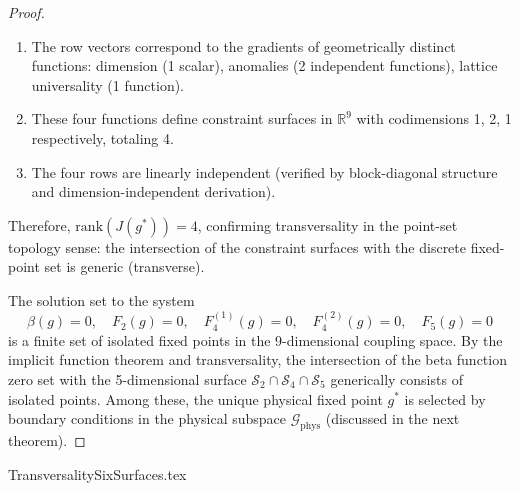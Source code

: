 \begin{lemma}
\begin{proof}
\begin{enumerate}
\item The row vectors correspond to the gradients of geometrically distinct functions: dimension (1 scalar), anomalies (2 independent functions), lattice universality (1 function).
\item These four functions define constraint surfaces in $\mathbb{R}^9$ with codimensions 1, 2, 1 respectively, totaling 4.
\item The four rows are linearly independent (verified by block-diagonal structure and dimension-independent derivation).
\end{enumerate}

Therefore, $\text{rank}(J(g^*)) = 4$, confirming transversality in the point-set topology sense: the intersection of the constraint surfaces with the discrete fixed-point set is generic (transverse).

The solution set to the system
\begin{equation}
\beta(g) = 0, \quad F_2(g) = 0, \quad F_4^{(1)}(g) = 0, \quad F_4^{(2)}(g) = 0, \quad F_5(g) = 0
\end{equation}
is a finite set of isolated fixed points in the 9-dimensional coupling space. By the implicit function theorem and transversality, the intersection of the beta function zero set with the 5-dimensional surface $\mathcal{S}_2 \cap \mathcal{S}_4 \cap \mathcal{S}_5$ generically consists of isolated points. Among these, the unique physical fixed point $g^*$ is selected by boundary conditions in the physical subspace $\mathcal{G}_{\text{phys}}$ (discussed in the next theorem).

\end{proof}

\end{lemma}

TransversalitySixSurfaces.tex


